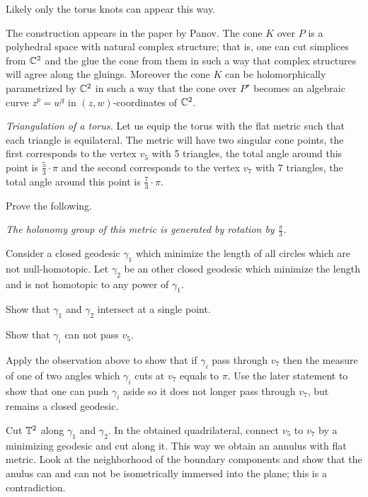 Likely only the torus knots can appear this way.

The construction appears in the paper \cite{panov-Kaeler} by Panov.
The cone $K$ over $P$ is a polyhedral space with natural complex structure;
that is, one can cut simplices from $\mathbb{C}^2$ and the glue the cone from them in such a way that complex structures will agree along the gluings.
Moreover the cone $K$ can be holomorphically parametrized by $\mathbb{C}^2$ in such a way that the cone over $P^\star$ becomes an algebraic curve $z^p=w^q$ in $(z,w)$-coordinates of $\mathbb{C}^2$.



\textit{Triangulation of a torus.}
Let us equip the torus with the flat metric such that each triangle is equilateral.
The metric will have two singular cone points,
the first corresponds to the vertex $v_5$ with 5 triangles,
the total angle around this point is $\tfrac53\cdot\pi$
and the second corresponds to the vertex $v_7$ with 7 triangles,
the total angle around this point is $\tfrac73\cdot\pi$.

Prove the following.

 \textit{The holonomy group of this metric is generated by rotation by $\tfrac\pi3$.}

\medskip

Consider a closed geodesic $\gamma_1$ which minimize the length of all circles which are not null-homotopic.
Let $\gamma_2$ be an other closed geodesic which minimize the length and is not homotopic to any power of $\gamma_1$.

Show that $\gamma_1$ and $\gamma_2$ intersect at a single point.

Show that $\gamma_i$ can not pass $v_5$.

Apply the observation above 
to show that if $\gamma_i$ pass through $v_7$ then the measure  
of one of two angles which $\gamma_i$ cuts at $v_7$ equals to $\pi$.
Use the later statement to show that  
one can push $\gamma_i$ aside so it does not longer pass through $v_7$, but remains a closed geodesic.

Cut $\mathbb{T}^2$ along $\gamma_1$ and $\gamma_2$.
In the obtained quadrilateral, connect $v_5$ to $v_7$ by a minimizing geodesic and cut along it.
This way we obtain an annulus with flat metric.
Look at the neighborhood of the boundary components and show that the anulus can and can not be isometrically immersed into the plane;
this is a contradiction.

